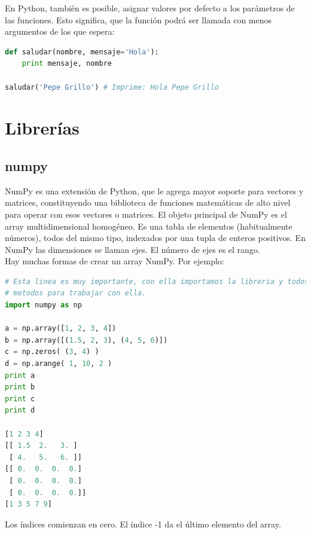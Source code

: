 \documentclass[a4paper, openright, 12pt]{article}
\begin{document}
    En Python, también es posible, asignar valores por defecto a los parámetros de las funciones. Esto significa, que la función podrá ser llamada con menos argumentos de los que espera:\\

\begin{lstlisting}[language=Python]
def saludar(nombre, mensaje='Hola'):
    print mensaje, nombre

saludar('Pepe Grillo') # Imprime: Hola Pepe Grillo
\end{lstlisting}

    \newpage{}




  \section{Librerías}
    \subsection{numpy}


NumPy es una extensión de Python, que le agrega mayor soporte para vectores y matrices, constituyendo una biblioteca de funciones matemáticas de alto nivel para operar con esos vectores o matrices. El objeto principal de NumPy es el array multidimensional homogéneo. Es una tabla de elementos (habitualmente números), todos del mismo tipo, indexados por una tupla de enteros positivos. En NumPy las dimensiones se llaman ejes. El número de ejes es el rango.\\

Hay muchas formas de crear un array NumPy. Por ejemplo:\\

\begin{lstlisting}[language=Python]
# Esta linea es muy importante, con ella importamos la libreria y todos sus
# metodos para trabajar con ella.
import numpy as np

a = np.array([1, 2, 3, 4])
b = np.array([(1.5, 2, 3), (4, 5, 6)])
c = np.zeros( (3, 4) )
d = np.arange( 1, 10, 2 )
print a
print b
print c
print d

[1 2 3 4]
[[ 1.5  2.   3. ]
 [ 4.   5.   6. ]]
[[ 0.  0.  0.  0.]
 [ 0.  0.  0.  0.]
 [ 0.  0.  0.  0.]]
[1 3 5 7 9]

\end{lstlisting}


Los índices comienzan en cero. El índice -1 da el último elemento del array.\\
\end{document}
